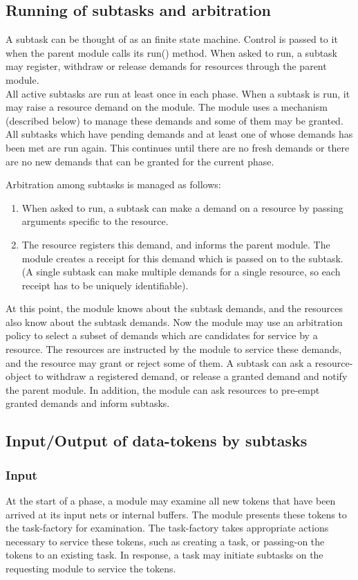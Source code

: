 	 
\subsection{Running of subtasks and arbitration}
	A subtask can be thought of as an finite state machine. 
	Control is passed to it	when the parent module calls its run() method. 
	When asked to run, a subtask may register, withdraw or release demands 
	for resources through the parent module. \\

	All active subtasks are run at least once in each phase.
	When a subtask is run, it may raise a resource demand on the
	module.  The module uses a mechanism (described below) to 
	manage these demands and some of them may be granted.
	All subtasks which have pending demands and at least
	one of whose demands has been met are run again.  This
	continues until there are no fresh demands or there are
	no new demands that can be granted for the current phase.
	
	Arbitration among subtasks is managed as follows:
	\begin{enumerate}
		\item When asked to run, a subtask can make a demand on a resource 
			by passing arguments specific to the resource.
		\item The resource registers this demand, and informs the parent 
			module. The module creates a receipt for this demand 
			which is passed on to the subtask.
			(A single subtask can make multiple demands for a single resource, so
			each receipt has to be uniquely identifiable).
	\end{enumerate}
	At this point, the module knows about the subtask demands, and the
	resources also know about the subtask demands.
	Now the module may use an arbitration policy to select a subset
	of demands which are candidates for service by a resource.  The
	resources are instructed by the module to service these demands,
	and the resource may grant or reject some of them. 
	A subtask can ask a resource-object to withdraw a 
	registered demand, or release a granted demand
	and notify the parent module. 
	In addition, the module can ask resources to pre-empt  
	granted demands and inform subtasks.

\subsection{Input/Output of data-tokens by subtasks}
	\subsubsection{Input}
	At the start of a phase, a module may examine all new tokens that
	have been arrived at its input nets or internal buffers. The module
	presents these tokens to the task-factory for examination. The 
	task-factory takes appropriate actions necessary to service these tokens,
	such as creating a task, or passing-on the tokens to an existing task.
	In response, a task may initiate subtasks on the requesting module to 
	service the tokens.

